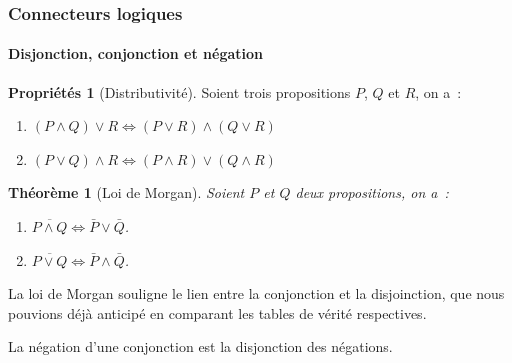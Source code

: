 \documentclass[10pt,notheorems]{beamer}
\theoremstyle{plain}
\newtheorem{theorem}{Théorème}
\theoremstyle{definition} %
\newtheorem{properties}{Propriétés}
\begin{document}
  \begin{frame}
    \frametitle{Connecteurs logiques}
    \framesubtitle{Disjonction, conjonction et négation}

  \begin{properties}[Distributivité]\label{properties:distributivite}
    Soient trois propositions $P$, $Q$ et $R$, on a :
    \begin{enumerate}
    \item $(P\land Q)\lor R \Leftrightarrow (P\lor R) \land (Q\lor R)$
    \item $(P\lor Q)\land R \Leftrightarrow (P\land R) \lor (Q\land R)$
    \end{enumerate}
  \end{properties}

  \bigskip

  \begin{theorem}[Loi de Morgan]\label{theorem:morgan}
    Soient $P$ et $Q$ deux propositions, on a :
    \begin{enumerate}
    \item $\overline{P \land Q} \Leftrightarrow \bar P \lor \bar Q$.
    \item $\overline{P \lor Q} \Leftrightarrow \bar P \land \bar Q$.
    \end{enumerate}
  \end{theorem}

  \bigskip
  
  La loi de Morgan souligne le lien entre la conjonction et la disjoinction, que nous pouvions déjà anticipé en comparant les tables de vérité respectives.\newline

  La négation d'une conjonction est la disjonction des négations.

  \end{frame}
\end{document}
